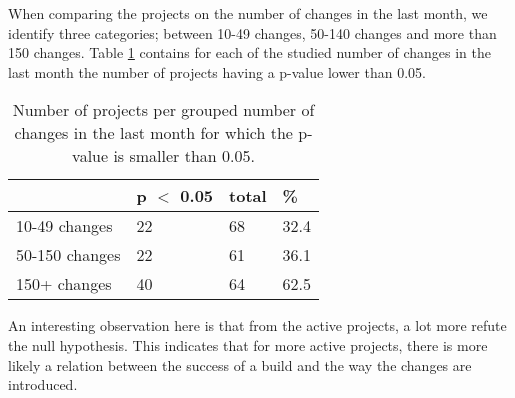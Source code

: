 When comparing the projects on the number of changes in the last month, we identify three categories; between 10-49 changes, 50-140 changes and more than 150 changes.
Table \ref{tab:p-for-changes} contains for each of the studied number of changes in the last month the number of projects having a p-value lower than 0.05.
\begin{table}[h]
\begin{tabular}{ l | l l l}
 & p $<$ 0.05 & total & \%\\
\hline
10-49 changes & 22 & 68 & 32.4\\
50-150 changes & 22 & 61 & 36.1 \\
150+ changes & 40 & 64 & 62.5
\end{tabular}
\caption{Number of projects per grouped number of changes in the last month for which the p-value is smaller than 0.05.}
\label{tab:p-for-changes}
\end{table}
An interesting observation here is that from the active projects, a lot more refute the null hypothesis. 
This indicates that for more active projects, there is more likely a relation between the success of a build and the way the changes are introduced.





















